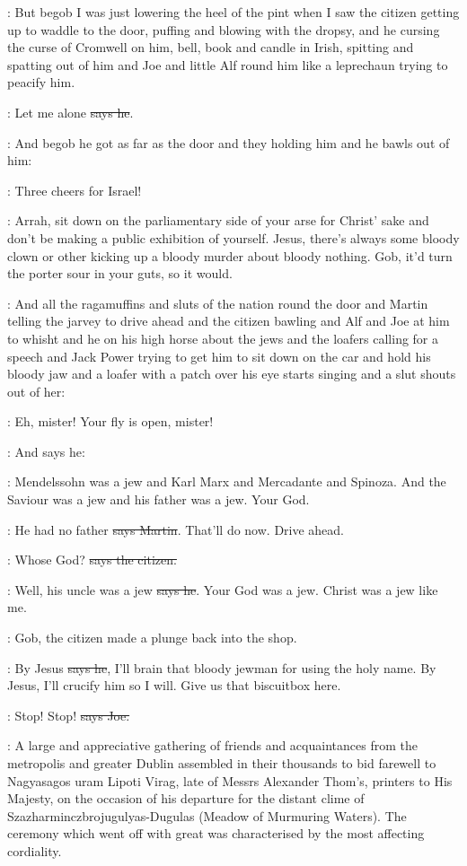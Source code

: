 \Nq:
But begob I was just lowering the heel of the pint when I saw the
citizen getting up to waddle to the door, puffing and blowing with the
dropsy, and he cursing the curse of Cromwell on him, bell, book and candle
in Irish, spitting and spatting out of him and Joe and little Alf round
him like a leprechaun trying to peacify him.

\citizen:
Let me alone \sout{says he}.

\Nq:
And begob he got as far as the door and they holding him and he
bawls out of him:

\citizen:
Three cheers for Israel!

\Nq:
Arrah, sit down on the parliamentary side of your arse for Christ'
sake and don't be making a public exhibition of yourself. Jesus, there's
always some bloody clown or other kicking up a bloody murder about
bloody nothing. Gob, it'd turn the porter sour in your guts, so it would.

\Nq:
And all the ragamuffins and sluts of the nation round the door and Martin
telling the jarvey to drive ahead and the citizen bawling and Alf and
Joe at him to whisht and he on his high horse about the jews and the
loafers calling for a speech and Jack Power trying to get him to sit down
on the car and hold his bloody jaw and a loafer with a patch over his eye
starts singing  and a slut
shouts out of her:

\ragamuffin:
Eh, mister! Your fly is open, mister!

\Nq:
And says he:

\Bloom:
Mendelssohn was a jew and Karl Marx and Mercadante and Spinoza.
And the Saviour was a jew and his father was a jew. Your God.

\cunningham:
He had no father \sout{says Martin}.
That'll do now. Drive ahead.

\citizen:
Whose God? \sout{says the citizen.}

\Bloom:
Well, his uncle was a jew \sout{says he}.
Your God was a jew. Christ was a jew
like me.

\Nq:
Gob, the citizen made a plunge back into the shop.

\citizen:
By Jesus \sout{says he},
I'll brain that bloody jewman for using the holy
name. By Jesus, I'll crucify him so I will.
Give us that biscuitbox here.

\joe:
Stop! Stop! \sout{says Joe.}

:
A large and appreciative gathering of friends and acquaintances from
the metropolis and greater Dublin assembled in their thousands to bid
farewell to Nagyasagos uram Lipoti Virag, late of Messrs Alexander
Thom's, printers to His Majesty, on the occasion of his departure for the
distant clime of Szazharminczbrojugulyas-Dugulas (Meadow of
Murmuring Waters). The ceremony which went off with great  was
characterised by the most affecting cordiality.

